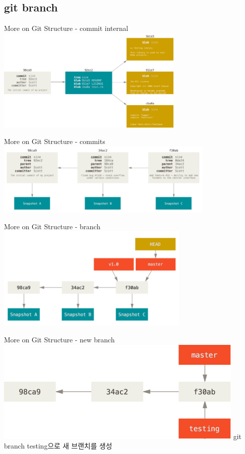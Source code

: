 \documentclass{beamer}
\begin{document}
\subsection{git branch} 

\begin{frame}{More on Git Structure - commit internal} 
\includegraphics[height=5cm,keepaspectratio]{commit-and-tree}
\end{frame}

\begin{frame}{More on Git Structure - commits} 
\includegraphics[height=3.5cm,keepaspectratio]{commits-and-parents}
\end{frame}

\begin{frame}{More on Git Structure - branch} 
\includegraphics[height=5cm,keepaspectratio]{branch-and-history}
\end{frame}

\begin{frame}{More on Git Structure - new branch} 
\includegraphics[height=5cm,keepaspectratio]{two-branches}
git branch testing으로 새 브랜치를 생성
\end{frame}
\end{document}
